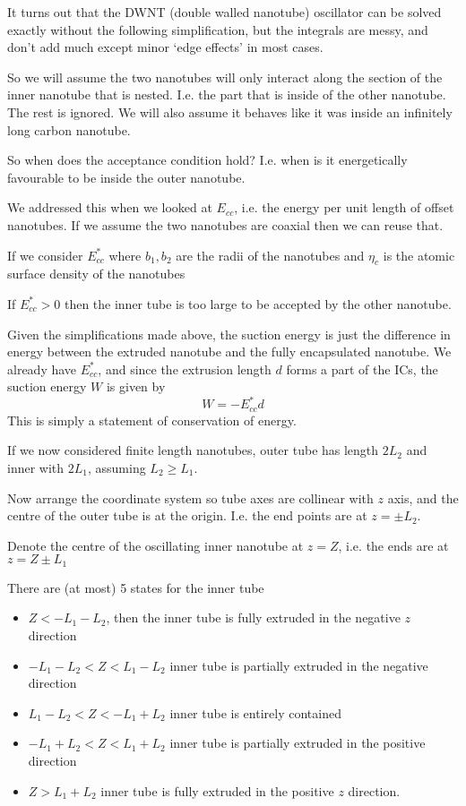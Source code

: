 \documentclass{X:/Documents/Coding/Latex/myassignment}
\begin{document}
It turns out that the DWNT (double walled nanotube) oscillator can be solved exactly without the following simplification, but the integrals are messy, and don't add much except minor `edge effects' in most cases.

So we will assume the two nanotubes will only interact along the section of the inner nanotube that is nested. I.e. the part that is inside of the other nanotube. The rest is ignored. We will also assume it behaves like it was inside an infinitely long carbon nanotube.


So when does the acceptance condition hold? I.e. when is it energetically favourable to be inside the outer nanotube.

We addressed this when we looked at $E_{cc}$, i.e. the energy per unit length of offset nanotubes. If we assume the two nanotubes are coaxial then we can reuse that.

If we consider $E_{cc}^*$ where $b_1,b_2$ are the radii of the nanotubes and $\eta_c$ is the atomic surface density of the nanotubes

If $E_{cc}^* > 0$ then the inner tube is too large to be accepted by the other nanotube.

Given the simplifications made above, the suction energy is just the difference in energy between the extruded nanotube and the fully encapsulated nanotube. We already have $E_{cc}^*$, and since the extrusion length $d$ forms a part of the ICs, the suction energy $W$ is given by
\[W = -E_{cc}^* d\]
This is simply a statement of conservation of energy. 

If we now considered finite length nanotubes, outer tube has length $2L_2$ and inner with $2L_1$, assuming $L_2 \geq L_1$.

Now arrange the coordinate system so tube axes are collinear with $z$ axis, and the centre of the outer tube is at the origin. I.e. the end points are at $z = \pm L_2$.

Denote the centre of the oscillating inner nanotube at $z = Z$, i.e. the ends are at $z = Z\pm L_1$

There are (at most) 5 states for the inner tube
\begin{itemize}
	\item $Z < -L_1 - L_2$, then the inner tube is fully extruded in the negative $z$ direction
	\item $-L_1 - L_2 < Z < L_1 - L_2$ inner tube is partially extruded in the negative direction
	\item $L_1 - L_2 < Z < -L_1 +L_2$ inner tube is entirely contained
	\item $-L_1 + L_2 < Z < L_1 + L_2$ inner tube is partially extruded in the positive direction
	\item $Z > L_1 + L_2$ inner tube is fully extruded in the positive $z$ direction.
\end{itemize}
\end{document}

